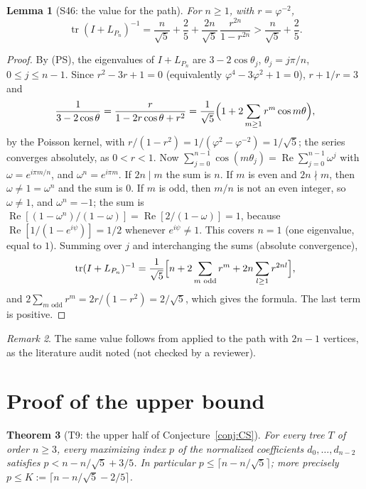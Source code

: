 \documentclass[11pt]{amsart}
\newtheorem{theorem}{Theorem}[section]
\newtheorem{lemma}[theorem]{Lemma}
\theoremstyle{definition}
\theoremstyle{remark}
\newtheorem{remark}[theorem]{Remark}
\newcommand{\tr}{\operatorname{tr}}
\begin{document}
\begin{lemma}[S46: the value for the path]\label{lem:S46}
For $n\ge1$, with $r=\varphi^{-2}$,
\[
\tr(I+L_{P_n})^{-1}=\frac{n}{\sqrt5}+\frac25+\frac{2n}{\sqrt5}\,\frac{r^{2n}}{1-r^{2n}}>\frac{n}{\sqrt5}+\frac25 .
\]
\end{lemma}

\begin{proof}
By (PS), the eigenvalues of $I+L_{P_n}$ are $3-2\cos\theta_j$,
$\theta_j=j\pi/n$, $0\le j\le n-1$. Since $r^2-3r+1=0$ (equivalently
$\varphi^4-3\varphi^2+1=0$), $r+1/r=3$ and
\[
\frac1{3-2\cos\theta}=\frac{r}{1-2r\cos\theta+r^2}
=\frac1{\sqrt5}\Bigl(1+2\sum_{m\ge1}r^m\cos m\theta\Bigr),
\]
by the Poisson kernel, with $r/(1-r^2)=1/(\varphi^2-\varphi^{-2})=1/\sqrt5$;
the series converges absolutely, as $0<r<1$. Now
$\sum_{j=0}^{n-1}\cos(m\theta_j)=\operatorname{Re}\sum_{j=0}^{n-1}\omega^j$ with
$\omega=e^{i\pi m/n}$, and $\omega^n=e^{i\pi m}$. If $2n\mid m$ the sum is $n$.
If $m$ is even and $2n\nmid m$, then $\omega\ne1=\omega^n$ and the sum is $0$.
If $m$ is odd, then $m/n$ is not an even integer, so $\omega\ne1$, and
$\omega^n=-1$; the sum is
$\operatorname{Re}[(1-\omega^n)/(1-\omega)]=\operatorname{Re}[2/(1-\omega)]=1$,
because $\operatorname{Re}[1/(1-e^{i\psi})]=1/2$ whenever $e^{i\psi}\ne1$.
This covers $n=1$ (one eigenvalue, equal to $1$). Summing over $j$ and
interchanging the sums (absolute convergence),
\[
\tr(I+L_{P_n})^{-1}=\frac1{\sqrt5}\Bigl[n+2\sum_{m\text{ odd}}r^m+2n\sum_{l\ge1}r^{2nl}\Bigr],
\]
and $2\sum_{m\text{ odd}}r^m=2r/(1-r^2)=2/\sqrt5$, which gives the formula.
The last term is positive.
\end{proof}

\begin{remark}
The same value follows from \cite[Lemma~4.2, eq.~(8)]{AMW} applied to the
path with $2n-1$ vertices, as the literature audit noted (not checked by a
reviewer).
\end{remark}

\section{Proof of the upper bound}\label{sec:proof}

\begin{theorem}[T9: the upper half of Conjecture~\ref{conj:CS}]\label{thm:T9}
For every tree $T$ of order $n\ge3$, every maximizing index $p$ of the
normalized coefficients $d_0,\dots,d_{n-2}$ satisfies $p<n-n/\sqrt5+3/5$. In
particular $p\le\lceil n-n/\sqrt5\rceil$; more precisely
$p\le K:=\lceil n-n/\sqrt5-2/5\rceil$.
\end{theorem}
\end{document}
